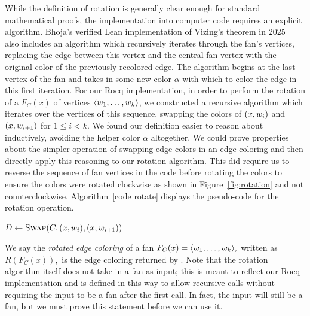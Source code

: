 While the definition of rotation is generally clear enough for standard mathematical proofs, the implementation into computer code requires an explicit algorithm. Bhoja's verified Lean implementation of Vizing's theorem in 2025~\cite{Bhoja} also includes an algorithm  which recursively iterates through the fan's vertices, replacing the edge between this vertex and the central fan vertex with the original color of the previously recolored edge. The algorithm begins at the last vertex of the fan and takes in some new color $\alpha$ with which to color the edge in this first iteration. For our Rocq implementation, in order to perform the rotation of a $F_C(x)$ of vertices $\langle w_1, \dots, w_k\rangle$, we constructed a recursive algorithm  which iterates over the vertices of this sequence, swapping the colors of $(x, w_i)$ and $(x, w_{i+1})$ for $1 \leq i < k$. We found our definition easier to reason about inductively, avoiding the helper color $\alpha$ altogether. We could prove properties about the simpler operation of swapping edge colors in an edge coloring and then directly apply this reasoning to our rotation algorithm. This did require us to reverse the sequence of fan vertices in the code before rotating the colors to ensure the colors were rotated clockwise as shown in Figure~\ref{fig:rotation} and not counterclockwise. Algorithm~\ref{code rotate} displays the pseudo-code for the rotation operation.

\begin{algorithm}
  \caption{Rotation \label{code rotate}}
  \begin{algorithmic}[1]
    \Statex
            \State $D \gets \Call{Swap}{C, \e{x}{w_i}, \e{x}{w_{i+1}}}$
            \State {}
        \Else
            \State {}
        \EndIf
    \EndFunction
  \end{algorithmic}
\end{algorithm}

We say the \textit{rotated edge coloring} of a fan $F_C(x) =  \langle w_1, \dots, w_k\rangle,$ written as $R(F_C(x)),$ is the edge coloring returned by . Note that the rotation algorithm itself does not take in a fan as input; this is meant to reflect our Rocq implementation and is defined in this way to allow recursive calls without requiring the input to be a fan after the first call. In fact, the input will still be a fan, but we must prove this statement before we can use it.

